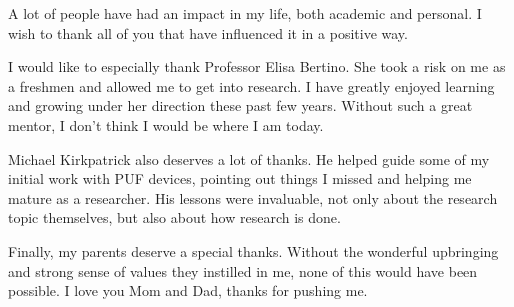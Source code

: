 %
%
%
%
%



\begin{acknowledgments}
A lot of people have had an impact in my life, both academic and personal. I wish to thank all of you 
that have influenced it in a positive way.

I would like to especially thank Professor Elisa Bertino. She took a risk on me as a freshmen and allowed 
me to get into research. I have greatly enjoyed learning and growing under her direction these past few 
years. Without such a great mentor, I don't think I would be where I am today.

Michael Kirkpatrick also deserves a lot of thanks. He helped guide some of my initial work with PUF devices,
pointing out things I missed and helping me mature as a researcher. His lessons were invaluable, not
only about the research topic themselves, but also about how research is done.

Finally, my parents deserve a special thanks. Without the wonderful upbringing and strong sense of values 
they instilled in me, none of this would have been possible. I love you Mom and Dad, thanks for pushing
me.

\end{acknowledgments}


